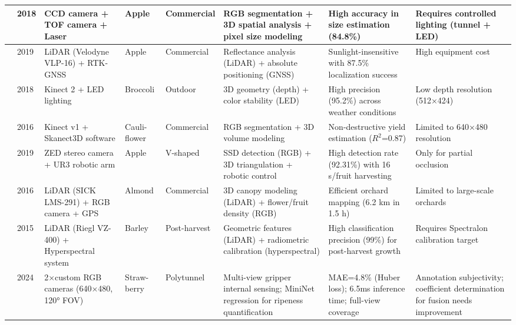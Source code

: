 \documentclass{ieeeaccess}
\begin{document}
\begin{table}[ht]
\begin{tabular}{p{}p{}p{}p{}p{}p{}p{}p{}}
\hline
\cite{gongal2018apple} & 2018 & CCD camera + TOF camera + Laser & Apple & Commercial & RGB segmentation + 3D spatial analysis + pixel size modeling & High accuracy in size estimation (84.8\%) & Requires controlled lighting (tunnel + LED) \\ 
\hline
\cite{gene2019fruit} & 2019 & LiDAR (Velodyne VLP-16) + RTK-GNSS & Apple & Commercial & Reflectance analysis (LiDAR) + absolute positioning (GNSS) & Sunlight-insensitive with 87.5\% localization success & High equipment cost  \\ 
\hline
\cite{kusumam20173d} & 2018 & Kinect 2 + LED lighting & Broccoli & Outdoor & 3D geometry (depth) + color stability (LED) & High precision (95.2\%) across weather conditions & Low depth resolution (512×424)  \\ 
\hline
\cite{andujar2016using} & 2016 & Kinect v1 + Skanect3D software & Cauli- flower & Commercial & RGB segmentation + 3D volume modeling & Non-destructive yield estimation ($R^2$=0.87) & Limited to 640×480 resolution \\ 
\hline
\cite{onishi2019automated} & 2019 & ZED stereo camera + UR3 robotic arm & Apple & V-shaped & SSD detection (RGB) + 3D triangulation + robotic control & High detection rate (92.31\%) with 16 s/fruit harvesting & Only for partial occlusion \\ 
\hline
\cite{underwood2016mapping} & 2016 & LiDAR (SICK LMS-291) + RGB camera + GPS & Almond & Commercial & 3D canopy modeling (LiDAR) + flower/fruit density (RGB) & Efficient orchard mapping (6.2 km in 1.5 h) & Limited to large-scale orchards  \\ 
\hline
\cite{koenig2015comparative} & 2015 & LiDAR (Riegl VZ-400) + Hyperspectral system & Barley & Post-harvest & Geometric features (LiDAR) + radiometric calibration (hyperspectral) & High classification precision (99\%) for post-harvest growth & Requires Spectralon calibration target  \\ 
\hline
\cite{ge2024multi} & 2024 & 2×custom RGB cameras (640×480, 120° FOV) & Straw- berry & Polytunnel & Multi-view gripper internal sensing; MiniNet regression for ripeness quantification & MAE=4.8\% (Huber loss); 6.5ms inference time; full-view coverage & Annotation subjectivity; coefficient determination for fusion needs improvement \\

\end{tabular}
\end{table}
\end{document}
